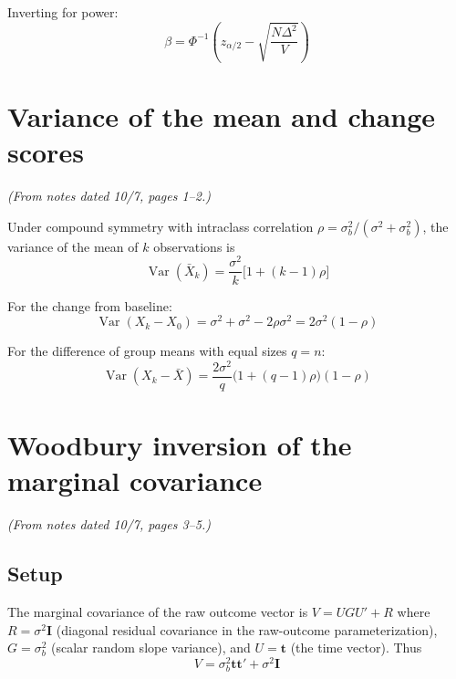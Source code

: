 \documentclass[11pt]{article}
\DeclareMathOperator{\Var}{Var}
\newcommand{\bI}{\mathbf{I}}
\newcommand{\bt}{\mathbf{t}}
\begin{document}
Inverting for power:
\begin{equation}
  \beta = \Phi^{-1}\!\left(
    z_{\alpha/2} - \sqrt{\frac{N\Delta^2}{V}}
  \right)
\end{equation}


\section{Variance of the mean and change scores}
\label{sec:varmean}

\noindent
\textit{(From notes dated 10/7, pages 1--2.)}

\medskip
\noindent
Under compound symmetry with intraclass correlation
$\rho = \sigma_b^2 / (\sigma^2 + \sigma_b^2)$, the
variance of the mean of $k$ observations is
\begin{equation}
  \Var(\bar{X}_k)
  = \frac{\sigma^2}{k}\bigl[1 + (k-1)\rho\bigr]
\end{equation}

For the change from baseline:
\begin{equation}
  \Var(X_k - X_0)
  = \sigma^2 + \sigma^2 - 2\rho\sigma^2
  = 2\sigma^2(1 - \rho)
\end{equation}

For the difference of group means with equal sizes $q = n$:
\begin{equation}
  \Var(X_k - \bar{X})
  = \frac{2\sigma^2}{q}\bigl(1 + (q-1)\rho\bigr)(1-\rho)
\end{equation}


\section{Woodbury inversion of the marginal covariance}
\label{sec:woodbury}

\noindent
\textit{(From notes dated 10/7, pages 3--5.)}


\subsection{Setup}

The marginal covariance of the raw outcome vector is
$V = UGU' + R$ where $R = \sigma^2 \bI$ (diagonal residual
covariance in the raw-outcome parameterization),
$G = \sigma_b^2$ (scalar random slope variance), and
$U = \bt$ (the time vector). Thus
\begin{equation}
  V = \sigma_b^2 \bt\bt' + \sigma^2 \bI
\end{equation}
\end{document}
